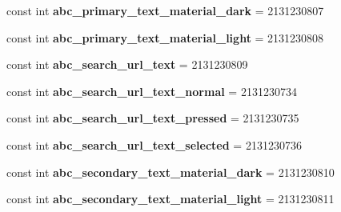 \begin{DoxyCompactItemize}
\item 
\hypertarget{classClient_1_1Droid_1_1Resource_1_1Color_acce32b2e9ac5acde3d79d697c35aeb0b}{}const int {\bfseries abc\+\_\+primary\+\_\+text\+\_\+material\+\_\+dark} = 2131230807\label{classClient_1_1Droid_1_1Resource_1_1Color_acce32b2e9ac5acde3d79d697c35aeb0b}

\item 
\hypertarget{classClient_1_1Droid_1_1Resource_1_1Color_a11de65179b2ecceca814ca3c0a487b79}{}const int {\bfseries abc\+\_\+primary\+\_\+text\+\_\+material\+\_\+light} = 2131230808\label{classClient_1_1Droid_1_1Resource_1_1Color_a11de65179b2ecceca814ca3c0a487b79}

\item 
\hypertarget{classClient_1_1Droid_1_1Resource_1_1Color_a94beb7a6c08374e47236bf3b582b3721}{}const int {\bfseries abc\+\_\+search\+\_\+url\+\_\+text} = 2131230809\label{classClient_1_1Droid_1_1Resource_1_1Color_a94beb7a6c08374e47236bf3b582b3721}

\item 
\hypertarget{classClient_1_1Droid_1_1Resource_1_1Color_a92e045b9693e2390b4ec1bb6f31169fb}{}const int {\bfseries abc\+\_\+search\+\_\+url\+\_\+text\+\_\+normal} = 2131230734\label{classClient_1_1Droid_1_1Resource_1_1Color_a92e045b9693e2390b4ec1bb6f31169fb}

\item 
\hypertarget{classClient_1_1Droid_1_1Resource_1_1Color_a47b214071ab742ab74450bd7972aefb4}{}const int {\bfseries abc\+\_\+search\+\_\+url\+\_\+text\+\_\+pressed} = 2131230735\label{classClient_1_1Droid_1_1Resource_1_1Color_a47b214071ab742ab74450bd7972aefb4}

\item 
\hypertarget{classClient_1_1Droid_1_1Resource_1_1Color_a95c6be71fbe31fb75ce66f883c7daf5d}{}const int {\bfseries abc\+\_\+search\+\_\+url\+\_\+text\+\_\+selected} = 2131230736\label{classClient_1_1Droid_1_1Resource_1_1Color_a95c6be71fbe31fb75ce66f883c7daf5d}

\item 
\hypertarget{classClient_1_1Droid_1_1Resource_1_1Color_acd42a7a59ca55823c805c836a97c93cb}{}const int {\bfseries abc\+\_\+secondary\+\_\+text\+\_\+material\+\_\+dark} = 2131230810\label{classClient_1_1Droid_1_1Resource_1_1Color_acd42a7a59ca55823c805c836a97c93cb}

\item 
\hypertarget{classClient_1_1Droid_1_1Resource_1_1Color_aad3e364bb4454df4e73547921654803d}{}const int {\bfseries abc\+\_\+secondary\+\_\+text\+\_\+material\+\_\+light} = 2131230811\label{classClient_1_1Droid_1_1Resource_1_1Color_aad3e364bb4454df4e73547921654803d}


\end{DoxyCompactItemize}
